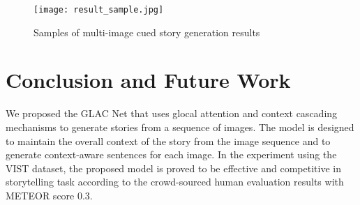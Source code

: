 \documentclass[11pt,a4paper]{article}
\begin{document}
\begin{table}
  \begin{center}
    \caption{Results from experiment settings. Baselines are reported in \cite{huang2016visual}.}
    \label{tab:result}
  \end{center}
\end{table}


\begin{figure}[!h]
\texttt{[image: result\_sample.jpg]}
\caption{Samples of multi-image cued story generation results}
\label{fig:result}
\end{figure}


\section{Conclusion and Future Work}

We proposed the GLAC Net that uses glocal attention and context cascading mechanisms to generate stories from a sequence of images. 
The model is designed to maintain the overall context of the story from the image sequence and to generate context-aware sentences for each image. 
In the experiment using the VIST dataset, the proposed model is proved to be effective and competitive in storytelling task according to the crowd-sourced human evaluation results with METEOR score 0.3.
\end{document}
